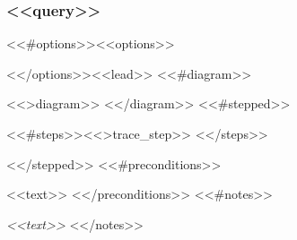 \subsubsection{\texorpdfstring{<<query>>}{<<queryplain>>}}
\label{atk:<<atkid>>}
<<#options>>\noindent<<options>>\par\smallskip
<</options>>\noindent <<lead>>
<<#diagram>>\par\nopagebreak
<<>diagram>>
<</diagram>>
<<#stepped>>
\begin{vptrace}
<<#steps>><<>trace_step>>
<</steps>>\end{vptrace}
<</stepped>>
<<#preconditions>>

\noindent <<text>>
<</preconditions>>
<<#notes>>

\noindent \emph{<<text>>}
<</notes>>
